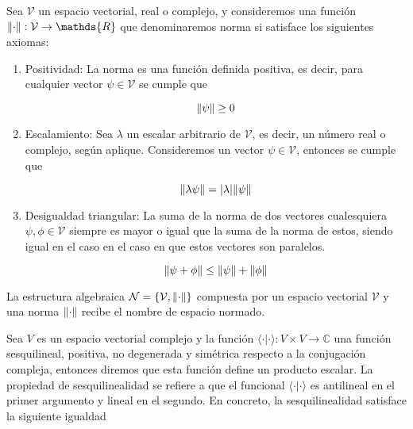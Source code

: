 Sea $\mathcal{V}$ un espacio vectorial, real o complejo, y consideremos una función $\norm{\cdot}: \mathcal{V} \rightarrow \mathds{R}$ que denominaremos norma si satisface los siguientes axiomas:

\begin{enumerate}
    \item Positividad: La norma es una función definida positiva, es decir, para cualquier vector $\psi \in \mathcal{V}$ se cumple que

        \begin{equation}
            \norm{\psi} \geq 0
        \end{equation}

    \item Escalamiento: Sea $\lambda$ un escalar arbitrario de $\mathcal{V}$, es decir, un número real o complejo, según aplique. Consideremos un vector $\psi \in \mathcal{V}$, entonces se cumple que

        \begin{equation}
            \norm{\lambda \psi} = \abs{\lambda} \norm{\psi}
        \end{equation}

    \item Desigualdad triangular: La suma de la norma de dos vectores cualesquiera $\psi, \phi \in \mathcal{V}$ siempre es mayor o igual que la suma de la norma de estos, siendo igual en el caso en el caso en que estos vectores son paralelos.

        \begin{equation}
            \norm{\psi + \phi} \leq \norm{\psi} + \norm{\phi}
        \end{equation}

\end{enumerate}

La estructura algebraica $\mathcal{N} = \{\mathcal{V}, \norm{\cdot}\}$ compuesta por un espacio vectorial $\mathcal{V}$ y una norma $\norm{\cdot}$ recibe el nombre de espacio normado.

Sea $\mathit{V}$ es un espacio vectorial complejo y la función $\langle \cdot | \cdot \rangle: \mathit{V} \times \mathit{V} \rightarrow \mathds{C}$ una función sesquilineal, positiva, no degenerada y simétrica respecto a la conjugación compleja, entonces diremos que esta función define un producto escalar. La propiedad de sesquilinealidad se refiere a que el funcional $\langle \cdot | \cdot \rangle$ es antilineal en el primer argumento y lineal en el segundo. En concreto, la sesquilinealidad satisface la siguiente igualdad

